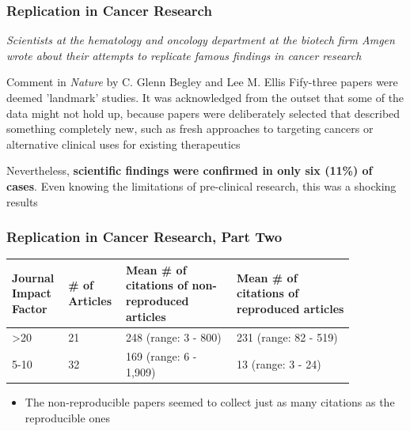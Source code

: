 \documentclass[10pt, block=fill]{beamer}
\begin{document}
\begin{frame}
  \frametitle{Replication in Cancer Research}

  \textit{Scientists at the hematology and oncology department at the biotech firm Amgen wrote about their attempts to replicate famous findings in cancer research}
  
  \begin{block}{Comment in \textit{Nature} by C. Glenn Begley and Lee M. Ellis}
  Fify-three papers were deemed 'landmark' studies. It was acknowledged from the outset that some of the data might not hold up, because papers were deliberately selected that described something completely new, such as fresh approaches to targeting cancers or alternative clinical uses for existing therapeutics \par
  Nevertheless, \textbf{scientific findings were confirmed in only six (11\%) of cases}. Even knowing the limitations of pre-clinical research, this was a shocking results
  \end{block}

\end{frame}


\begin{frame}
  \frametitle{Replication in Cancer Research, Part Two}

  \begin{tabular}{b{0.12\linewidth}b{0.12\linewidth}b{0.3\linewidth}b{0.32\linewidth}}
    \textbf{Journal Impact Factor} & \textbf{\# of Articles} & \textbf{Mean \# of citations of non-reproduced articles} & \textbf{Mean \# of citations of reproduced articles} \\ \hline
    >20 & 21 & 248 (range: 3 - 800) & 231 (range: 82 - 519) \\
    5-10 & 32 & 169 (range: 6 - 1,909) & 13 (range: 3 - 24)
  \end{tabular}

  \vspace{0.25in}
  
  \begin{itemize}
      \item The non-reproducible papers seemed to collect just as many citations as the reproducible ones
    \end{itemize}
      
\end{frame}
\end{document}
